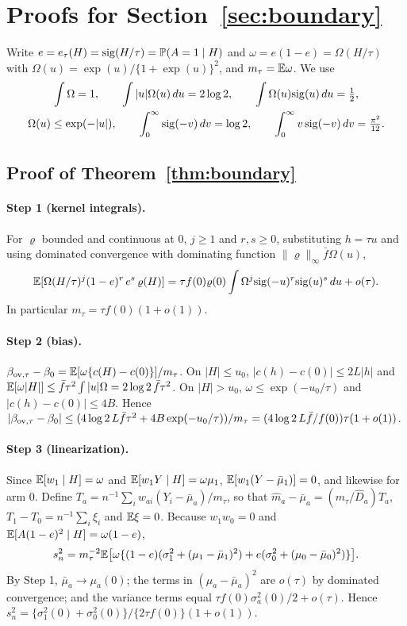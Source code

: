 \section{Proofs for Section~\ref{sec:boundary}}\label{app:boundary}

Write $e=e_\tau(H)=\mathrm{sig}(H/\tau)=\mathbb{P}(A=1\mid H)$ and
$\omega=e(1-e)=\Omega(H/\tau)$ with $\Omega(u)=\exp(u)/\{1+\exp(u)\}^2$, and
$m_\tau=\mathbb{E}\omega$. We use
\begin{gather*}
\int \Omega=1,\qquad \int|u|\Omega(u)\,du=2\log2,\qquad \int \Omega(u)\mathrm{sig}(u)\,du=\tfrac12,\\
\Omega(u)\le \exp(-|u|),\qquad \int_0^\infty\mathrm{sig}(-v)\,dv=\log2,\qquad \int_0^\infty v\,\mathrm{sig}(-v)\,dv=\tfrac{\pi^2}{12}.
\end{gather*}

\subsection{Proof of Theorem~\ref{thm:boundary}}

\paragraph{Step 1 (kernel integrals).} For $\varrho$ bounded and continuous at $0$,
$j\ge1$ and $r,s\ge0$, substituting $h=\tau u$ and using dominated convergence
with dominating function $\|\varrho\|_\infty\bar f\Omega(u)$,
\[
\mathbb{E}[\Omega(H/\tau)^j(1-e)^r\,e^s\,\varrho(H)]=\tau f(0)\varrho(0)\int \Omega^j\mathrm{sig}(-u)^r\mathrm{sig}(u)^s\,du+o(\tau).
\]
In particular $m_\tau=\tau f(0)(1+o(1))$.

\paragraph{Step 2 (bias).} $\beta_{\mathrm{ov},\tau}-\beta_0=\mathbb{E}[\omega\{c(H)-c(0)\}]/m_\tau$.
On $|H|\le u_0$, $|c(h)-c(0)|\le2L|h|$ and
$\mathbb{E}[\omega|H|]\le\bar f\tau^2\int|u|\Omega=2\log2\,\bar f\tau^2$. On $|H|>u_0$,
$\omega\le \exp(-u_0/\tau)$ and $|c(h)-c(0)|\le4B$. Hence
$|\beta_{\mathrm{ov},\tau}-\beta_0|\le(4\log2\,L\bar f\tau^2+4B\exp(-u_0/\tau))/m_\tau
=(4\log2\,L\bar f/f(0))\tau(1+o(1))$.

\paragraph{Step 3 (linearization).} Since $\mathbb{E}[w_1\mid H]=\omega$ and
$\mathbb{E}[w_1Y\mid H]=\omega\mu_1$, $\mathbb{E}[w_1(Y-\bar\mu_1)]=0$, and likewise for arm
$0$. Define $T_a=n^{-1}\sum_iw_{ai}(Y_i-\bar\mu_a)/m_\tau$, so that
$\hat m_a-\bar\mu_a=(m_\tau/\hat D_a)T_a$, $T_1-T_0=n^{-1}\sum_i\xi_i$ and
$\mathbb{E}\xi=0$. Because $w_1w_0=0$ and $\mathbb{E}[A(1-e)^2\mid H]=\omega(1-e)$,
\begin{equation}\label{eq:sn}
s_n^2=m_\tau^{-2}\mathbb{E}\big[\omega\{(1-e)(\sigma_1^2+(\mu_1-\bar\mu_1)^2)+e(\sigma_0^2+(\mu_0-\bar\mu_0)^2)\}\big].
\end{equation}
By Step 1, $\bar\mu_a\to\mu_a(0)$; the terms in $(\mu_a-\bar\mu_a)^2$ are
$o(\tau)$ by dominated convergence; and the variance terms equal
$\tau f(0)\sigma_a^2(0)/2+o(\tau)$. Hence
$s_n^2=\{\sigma_1^2(0)+\sigma_0^2(0)\}/\{2\tau f(0)\}(1+o(1))$.

